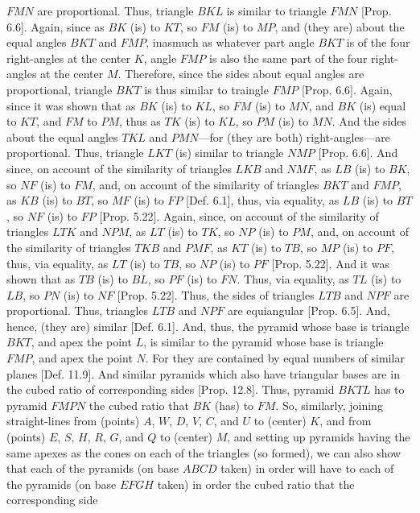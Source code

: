 \begin{Parallel}{}{}
{$FMN$ are proportional. Thus, triangle $BKL$ is similar to triangle $FMN$
[Prop. 6.6]. Again, since as $BK$ (is) to $KT$, so
$FM$ (is) to $MP$, and (they are) about the equal angles $BKT$ and $FMP$, inasmuch as whatever part angle $BKT$
is of the four right-angles at the center $K$, angle $FMP$ is also the same part of the four right-angles at the  center $M$. 
Therefore, since the sides about equal angles are proportional,  triangle $BKT$ is thus similar to traingle $FMP$ [Prop. 6.6].
Again, since it was shown that as $BK$ (is) to $KL$, so $FM$ (is) to $MN$, and $BK$ (is) equal to $KT$, and
$FM$ to $PM$, thus as $TK$ (is) to $KL$, so $PM$ (is) to $MN$. And the sides about the equal angles
$TKL$ and $PMN$---for (they are both) right-angles---are proportional.  Thus, triangle $LKT$ (is) similar to
triangle $NMP$ [Prop. 6.6]. And since, on account of the similarity of triangles $LKB$ and
$NMF$, as $LB$ (is) to $BK$, so $NF$ (is) to $FM$, and, on account of the  similarity of triangles $BKT$ and
$FMP$, as $KB$ (is) to $BT$, so $MF$ (is) to $FP$ [Def. 6.1], thus, via equality, as $LB$ (is)
to $BT$, so $NF$ (is) to $FP$ [Prop. 5.22]. Again, since, on account of the similarity of
triangles $LTK$ and $NPM$, as $LT$ (is) to $TK$, so $NP$ (is) to $PM$, and, on account of the similarity of
triangles $TKB$ and $PMF$, as $KT$ (is) to $TB$, so $MP$ (is) to $PF$, thus, via equality,  as $LT$ (is) to $TB$, so
$NP$ (is) to $PF$ [Prop. 5.22]. And it was shown that as $TB$ (is) to $BL$, so $PF$ (is) to $FN$.
 Thus, via equality, as $TL$ (is) to $LB$, so $PN$ (is) to $NF$ [Prop. 5.22]. Thus, the sides of triangles
 $LTB$ and $NPF$ are proportional. Thus, triangles $LTB$ and $NPF$ are equiangular [Prop. 6.5]. 
 And, hence, (they are) similar [Def. 6.1]. And, thus, the pyramid whose base is triangle $BKT$, and
 apex the point $L$, is similar to the pyramid whose base is triangle $FMP$, and apex the point $N$. For they are contained
 by equal numbers of similar planes [Def. 11.9]. And similar pyramids which also have triangular
 bases are in the cubed ratio of corresponding sides [Prop. 12.8]. Thus, pyramid
 $BKTL$ has to pyramid $FMPN$ the cubed ratio that $BK$ (has) to $FM$. So, similarly, joining
 straight-lines from (points) $A$, $W$, $D$, $V$, $C$, and $U$ to (center) $K$, and from (points) $E$, $S$, $H$, $R$,
 $G$,  and $Q$ to (center) $M$, and setting up pyramids having the same apexes as the cones on each of the triangles (so formed), we can also show
 that each of the pyramids (on base $ABCD$ taken) in order will have to each of the pyramids (on base $EFGH$ taken) in order the cubed ratio that the corresponding side
}
\end{Parallel}
